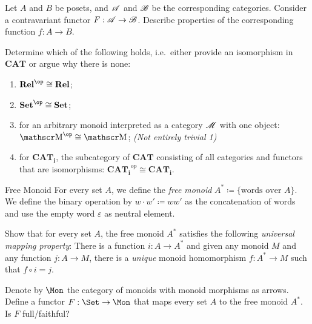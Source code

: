 \begin{exercise}
  Let $A$ and $B$ be posets, and $\operatorname{\mathscr A}$ and $\operatorname{\mathscr B}$ be the corresponding categories. Consider a contravariant functor $F:\operatorname{\mathscr A}\rightarrow \operatorname{\mathscr B}$. Describe properties of the corresponding function $f:A\rightarrow B$.
\end{exercise}

\begin{exercise}
  Determine which of the following holds, i.e.\ either provide an isomorphism in $\mathbf{CAT}$ or argue why there is none:

  \begin{enumerate}
  \item $\mathbf {Rel}^{\op}\cong \mathbf {Rel}$;
  \item $\mathbf {Set}^{\op}\cong \mathbf {Set}$;
  \item for an arbitrary monoid interpreted as a category $\operatorname{\mathscr M}$ with one object:  $\M^{\op}\cong \M$; \textit{(Not entirely trivial 1)}
  \item for $\mathbf{CAT_i}$, the subcategory of $\mathbf{CAT}$ consisting of all categories and functors that are isomorphisms: $\mathbf{CAT_i}^{op}\cong\mathbf{CAT_i}$.
  \end{enumerate}

\end{exercise}

\begin{definition}{Free Monoid}
  For every set $A$, we define the \emph{free monoid} $A^* \coloneqq \lbrace \text{words over $A$} \rbrace$.
  We define the binary operation by $w \cdot w' \coloneqq ww'$ as the concatenation of words and use the empty word $\varepsilon$ as neutral element.
\end{definition}

\begin{exercise}
  Show that for every set $A$, the free monoid $A^*$ satisfies the following \emph{universal mapping property}:
  There is a function $i : A \to A^*$ and given any monoid $M$ and any function $j : A \to M$, there is a \emph{unique} monoid homomorphism $f : A^* \to M$ such that $f \circ i = j$.
\end{exercise}

\begin{exercise}
  Denote by $\Mon$ the category of monoids with monoid morphisms as arrows.
  Define a functor $F : \Set \to \Mon$ that maps every set $A$ to the free monoid $A^*$.
  Is $F$ full/faithful?
\end{exercise}

